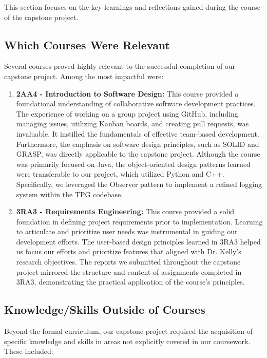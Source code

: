 \documentclass{article}
\begin{document}
This section focuses on the key learnings and reflections gained during the course of the capstone project.

\subsection{Which Courses Were Relevant}

Several courses proved highly relevant to the successful completion of our capstone project. Among the most impactful were:

\begin{enumerate}
    \item \textbf{2AA4 - Introduction to Software Design:} This course provided a foundational understanding of collaborative software development practices. The experience of working on a group project using GitHub, including managing issues, utilizing Kanban boards, and creating pull requests, was invaluable. It instilled the fundamentals of effective team-based development. Furthermore, the emphasis on software design principles, such as SOLID and GRASP, was directly applicable to the capstone project. Although the course was primarily focused on Java, the object-oriented design patterns learned were transferable to our project, which utilized Python and C++. Specifically, we leveraged the Observer pattern to implement a refined logging system within the TPG codebase.

    \item \textbf{3RA3 - Requirements Engineering:} This course provided a solid foundation in defining project requirements prior to implementation. Learning to articulate and prioritize user needs was instrumental in guiding our development efforts. The user-based design principles learned in 3RA3 helped us focus our efforts and prioritize features that aligned with Dr. Kelly's research objectives. The reports we submitted throughout the capstone project mirrored the structure and content of assignments completed in 3RA3, demonstrating the practical application of the course's principles.
\end{enumerate}

\subsection{Knowledge/Skills Outside of Courses}

Beyond the formal curriculum, our capstone project required the acquisition of specific knowledge and skills in areas not explicitly covered in our coursework. These included:
\end{document}
